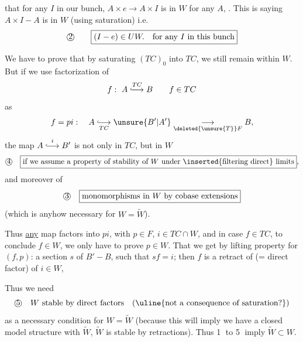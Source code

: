 
 that for any  $I$   in our bunch,
$A\times e\longrightarrow A\times I$ is in $W$ for any $A$, .
This is   saying $A\times I-A$ is in $W$ (using saturation) i.e.
\[
\text{\textcircled{2}}\qquad\boxed{(I-e)\in UW.\quad\text{for any }I\text{ in this bunch}}
\]

We have to prove that by saturating $(TC)_0$ into $TC$, we still remain within $W$. But if we use factorization of
\[
f:\ A\overset{TC}{\lhook\joinrel\longrightarrow}B\qquad f\in TC
\]
as
\[
f=pi:\quad A\underset{TC}{\lhook\joinrel\longrightarrow}\unsure{B'|A'}\underset{\deleted{\unsure{T}}F}{\longrightarrow}B,
\]
the map $A\overset{i}{\lhook\joinrel\longrightarrow}B'$ is not only in $TC$, but  in $W$
\[
\text{\textcircled{4}}\quad\boxed{\text{if we assume a property of stability of }W\text{ under \inserted{filtering direct} limits}},
\]
and moreover  of 
\[
\text{\textcircled{3}}\quad\boxed{\text{monomorphisms in }W\text{ by cobase extensions}}
\]
(which is anyhow necessary for $W=\widetilde W$). 

Thus \uline{any} map  factors into $pi$, with $p\in F$, $i\in TC\cap W$, and in case $f\in TC$, to conclude $f\in W$, we only have to prove $p\in W$. That we get by lifting property for $(f,p)$: a section $s$ of $B'-B$, such that $sf=i$; then $f$ is a retract of (= direct factor) of $i\in W$,

Thus we need 
\[
\text{\textcircled{5}}\quad W\text{ stable by direct factors}\quad(\text{\uline{not a consequence of saturation?}})
\]
as a necessary condition for $W=\widetilde W$ (because this will imply we have a closed model structure with $\widetilde W$,  $\widetilde W$ is stable by retractions). Thus \textcircled{1} to \textcircled{5} imply $\widetilde W\subset W$.

